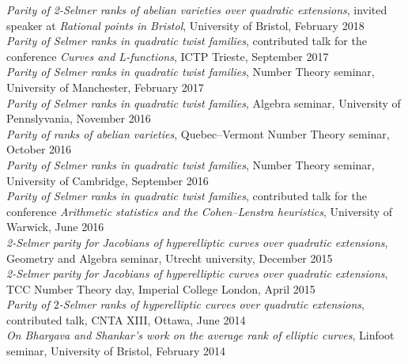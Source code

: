 \documentclass{res}
\begin{document}
\begin{resume}
{\it Parity of 2-Selmer ranks of abelian varieties over quadratic extensions}, invited speaker at {\it Rational points in Bristol}, University of Bristol, February 2018  \medskip \\
{\it Parity of Selmer ranks in quadratic twist families}, contributed talk for the conference {\it Curves and L-functions}, ICTP Trieste, September 2017  \medskip \\
{\it Parity of Selmer ranks in quadratic twist families}, Number Theory seminar, University of Manchester, February 2017  \medskip \\
{\it Parity of Selmer ranks in quadratic twist families}, Algebra seminar, University of Pennslyvania, November 2016  \medskip \\
{\it Parity of ranks of abelian varieties}, Quebec--Vermont Number Theory seminar, October 2016  \medskip \\
{\it Parity of Selmer ranks in quadratic twist families}, Number Theory seminar, University of Cambridge, September 2016  \medskip \\
{\it Parity of Selmer ranks in quadratic twist families}, contributed talk for the conference  {\it Arithmetic statistics and the Cohen--Lenstra heuristics}, University of Warwick, June 2016  \medskip \\
{\it 2-Selmer parity for Jacobians of hyperelliptic curves over quadratic extensions}, Geometry and Algebra seminar, Utrecht university, December 2015  \medskip \\
{\it 2-Selmer parity for Jacobians of hyperelliptic curves over quadratic extensions}, TCC Number Theory day, Imperial College London, April 2015  \medskip \\
 {\it Parity of $2$-Selmer ranks of hyperelliptic curves over quadratic extensions}, contributed talk, CNTA XIII, Ottawa, June 2014  \medskip \\
 {\it On Bhargava and Shankar's work on the average rank of elliptic curves}, Linfoot seminar, University of Bristol, February 2014  \medskip \\

\end{resume}
\end{document}
